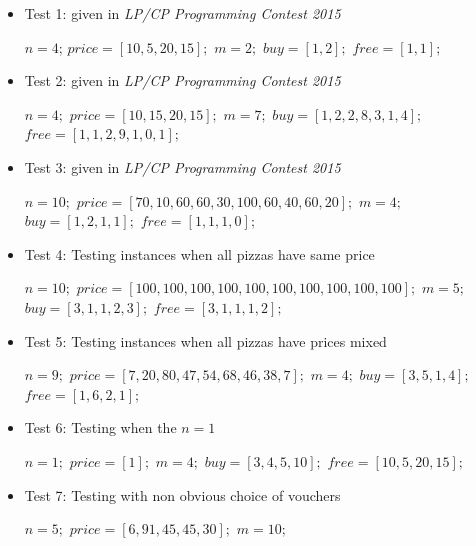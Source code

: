 \documentclass[conference]{IEEEtran}
\begin{document}
\begin{itemize}
\item Test 1: given in \textit{LP/CP Programming Contest 2015}
\begin{algorithmic}
\State $n = 4$;
\State $price = [10,5,20,15];$
\State $m = 2;$
\State $buy = [1,2];$
\State $free = [1,1];$
\\
\end{algorithmic}
\item Test 2: given in \textit{LP/CP Programming Contest 2015}
\begin{algorithmic}
\State $n = 4;$
\State $price = [10,15,20,15];$
\State $m = 7;$
\State $buy = [1,2,2,8,3,1,4];$
\State $free = [1,1,2,9,1,0,1];$
\\
\end{algorithmic}
\item Test 3: given in \textit{LP/CP Programming Contest 2015}
\begin{algorithmic}
\State $n = 10;$
\State $price = [70,10,60,60,30,100,60,40,60,20];$
\State $m = 4;$
\State $buy = [1,2,1,1];$
\State $free = [1,1,1,0];$
\\
\end{algorithmic}
\item Test 4: Testing instances when all pizzas have same price 
\begin{algorithmic}
\State $n = 10;$
\State $price = [100,100,100,100,100,100,100,100,100,100];$
\State $m = 5;$
\State $buy = [3,1,1,2,3];$
\State $free = [3,1,1,1,2];$
\\
\end{algorithmic}
\item Test 5: Testing instances when all pizzas have prices mixed 
\begin{algorithmic}
\State $n = 9;$
\State $price = [7,20,80,47,54,68,46,38,7];$
\State $m = 4;$
\State $buy = [3,5,1,4];$
\State $free = [1,6,2,1];$
\\
\end{algorithmic}
\item Test 6: Testing when the $n = 1$
\begin{algorithmic}
\State $n = 1;$
\State $price = [1];$
\State $m = 4;$
\State $buy = [3, 4, 5, 10];$
\State $free = [10,5,20,15];$
\\
\end{algorithmic}
\item Test 7: Testing with non obvious choice of vouchers
\begin{algorithmic}
\State $n = 5;$
\State $price = [6,91,45,45,30];$
\State $m = 10;$

\end{algorithmic}
\end{itemize}
\end{document}
